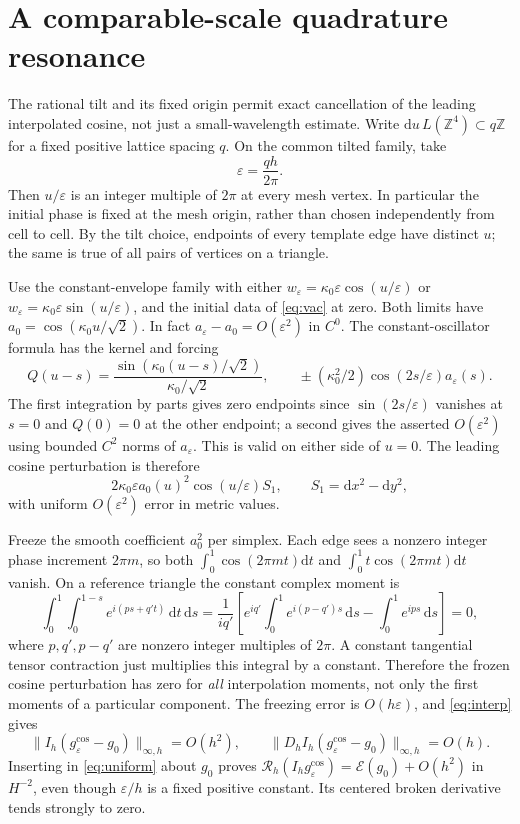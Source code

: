 \documentclass[11pt]{article}
\newcommand{\dd}{\mathrm d}
\newcommand{\Rcal}{\mathcal R}
\newcommand{\Ecal}{\mathcal E}
\begin{document}
\section{A comparable-scale quadrature resonance}\label{sec:alias}

The rational tilt and its fixed origin permit exact cancellation
of the leading interpolated cosine, not just a small-wavelength
estimate. Write
\(\dd u\,L(\mathbb Z^4)\subset q\mathbb Z\) for a fixed positive
lattice spacing \(q\). On the common tilted family, take
\begin{equation}
                        \varepsilon=\frac{q h}{2\pi}.
 \label{eq:critical}
\end{equation}
Then \(u/\varepsilon\) is an integer multiple of \(2\pi\)
at every mesh vertex. In particular the initial phase is fixed
at the mesh origin, rather than chosen independently from cell
to cell. By the tilt choice, endpoints of every template edge
have distinct \(u\); the same is true of all pairs of vertices
on a triangle.

Use the constant-envelope family with either
\(w_\varepsilon=\kappa_0\varepsilon\cos(u/\varepsilon)\) or
\(w_\varepsilon=\kappa_0\varepsilon\sin(u/\varepsilon)\), and
the initial data of \eqref{eq:vac} at zero. Both limits have
\(a_0=\cos(\kappa_0 u/\sqrt2)\). In fact
\(a_\varepsilon-a_0=O(\varepsilon^2)\) in \(C^0\).
The constant-oscillator formula has the kernel and forcing
\[
    Q(u-s)=\frac{\sin(\kappa_0(u-s)/\sqrt2)}{\kappa_0/\sqrt2},
    \qquad
    \pm(\kappa_0^2/2)\cos(2s/\varepsilon)a_\varepsilon(s).
\]
The first integration by parts gives zero endpoints since
\(\sin(2s/\varepsilon)\) vanishes at \(s=0\) and \(Q(0)=0\)
at the other endpoint; a second gives the asserted
\(O(\varepsilon^2)\) using bounded \(C^2\) norms of
\(a_\varepsilon\). This is valid on either side of \(u=0\).
The leading cosine perturbation is therefore
\[
     2\kappa_0\varepsilon a_0(u)^2\cos(u/\varepsilon)S_1,
     \qquad S_1=\dd x^2-\dd y^2 ,
\]
with uniform \(O(\varepsilon^2)\) error in metric values.

Freeze the smooth coefficient \(a_0^2\) per simplex. Each edge
sees a nonzero integer phase increment \(2\pi m\), so both
\(\int_0^1\cos(2\pi m t)\dd t\) and
\(\int_0^1t\cos(2\pi m t)\dd t\) vanish. On a reference triangle
the constant complex moment is
\[
 \int_0^1\int_0^{1-s}e^{i(ps+q' t)}\,\dd t\,\dd s
    =\frac{1}{i q'}\left[
       e^{i q'}\int_0^1 e^{i(p-q')s}\,\dd s
          -\int_0^1e^{ips}\,\dd s\right]=0,
\]
where \(p,q',p-q'\) are nonzero integer multiples of \(2\pi\).
A constant tangential tensor contraction just multiplies this
integral by a constant. Therefore the frozen cosine perturbation
has zero for \emph{all} interpolation moments, not only the
first moments of a particular component. The freezing error
is \(O(h\varepsilon)\), and \eqref{eq:interp} gives
\[
 \|I_h(g_\varepsilon^{\cos}-g_0)\|_{\infty,h}=O(h^2),
 \qquad
 \|D_h I_h(g_\varepsilon^{\cos}-g_0)\|_{\infty,h}=O(h).
\]
Inserting in \eqref{eq:uniform} about \(g_0\) proves
\(\Rcal_h(I_hg_\varepsilon^{\cos})=\Ecal(g_0)+O(h^2)\)
in \(H^{-2}\), even though \(\varepsilon/h\) is a fixed positive
constant. Its centered broken derivative tends strongly to zero.
\end{document}

